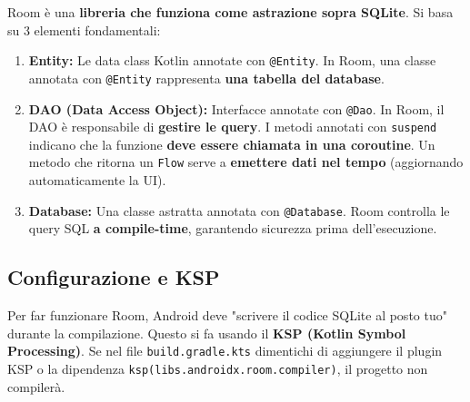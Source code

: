 Room è una \textbf{libreria che funziona come astrazione sopra SQLite}.
Si basa su 3 elementi fondamentali:
\begin{enumerate}
    \item \textbf{Entity:} Le data class Kotlin annotate con \texttt{@Entity}.
    In Room, una classe annotata con \texttt{@Entity} rappresenta \textbf{una tabella del database}.
    \item \textbf{DAO (Data Access Object):} Interfacce annotate con \texttt{@Dao}.
    In Room, il DAO è responsabile di \textbf{gestire le query}.
    I metodi annotati con \texttt{suspend} indicano che la funzione \textbf{deve essere chiamata in una coroutine}.
    Un metodo che ritorna un \texttt{Flow} serve a \textbf{emettere dati nel tempo} (aggiornando automaticamente la UI).
    \item \textbf{Database:} Una classe astratta annotata con \texttt{@Database}.
    Room controlla le query SQL \textbf{a compile-time}, garantendo sicurezza prima dell'esecuzione.
\end{enumerate}

\begin{center}
\end{center}

\subsection{Configurazione e KSP}
Per far funzionare Room, Android deve "scrivere il codice SQLite al posto tuo" durante la compilazione.
Questo si fa usando il \textbf{KSP (Kotlin Symbol Processing)}.
Se nel file \texttt{build.gradle.kts} dimentichi di aggiungere il plugin KSP o la dipendenza \texttt{ksp(libs.androidx.room.compiler)}, il progetto non compilerà.

